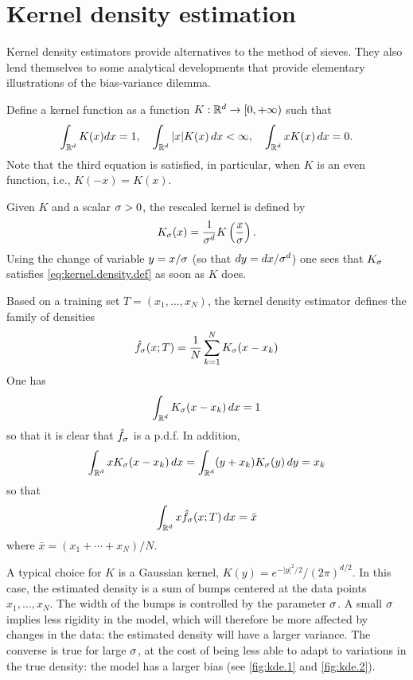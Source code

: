 \section{Kernel density  estimation}
Kernel density estimators \cite{parzen1962estimation,sheather1991reliable,silverman1998density} provide alternatives to the method of sieves. They also lend themselves to some analytical developments that provide elementary illustrations of the bias-variance dilemma.

Define a kernel function as a function $K: {\mathbb{R}}^d \to [0, +\infty)$ such that
\begin{equation}
\label{eq:kernel.density.def}
\int_{{\mathbb{R}}^d} K(x) dx = 1,\quad \int_{{\mathbb{R}}^d} |x| K(x)\, dx <\infty, \quad \int_{{\mathbb{R}}^d} x K(x)\, dx = 0.
\end{equation}
Note that the third equation is satisfied, in particular, when $K$ is an even function, i.e., $K(-x) = K(x)$. 

Given $K$ and a scalar  $\sigma >0$, the rescaled kernel is defined by
\[
K_\sigma(x) = \frac{1}{\sigma^d} K\left(\frac x {\sigma}\right).
\]
Using the change of variable $y = x/\sigma$ (so that $dy =
dx/\sigma^d$) one sees that $K_\sigma$ satisfies \cref{eq:kernel.density.def} as soon as $K$ does.

Based on a training set $T = (x_1, \ldots, x_N)$, the kernel density estimator defines the family of densities
$$
\hat f_\sigma(x; T)  = \frac{1}{N} \sum_{k=1}^N K_\sigma(x-x_k)
$$
One has 
\[
\int_{{\mathbb{R}}^d} K_\sigma(x-x_k)\, dx = 1
\]
so that it is clear that $\hat f_\sigma$ is a p.d.f. In addition, 
\[
\int_{{\mathbb{R}}^d} xK_\sigma(x-x_k)\, dx = \int_{{\mathbb{R}}^d} (y+x_k)K_\sigma(y)\, dy = x_k
\]
so that 
\[
\int_{{\mathbb{R}}^d} x {\hat{f}}_\sigma(x;T)\, dx = \bar x
\]
where $\bar x = (x_1 + \cdots + x_N)/N$.



A typical choice for $K$ is a Gaussian kernel, $K(y) =
e^{-|y|^2/2}/(2\pi)^{d/2}$. In this case, the estimated density is a sum
of bumps centered at the data points $x_1, \ldots, x_N$. The width of
the bumps is controlled by the parameter $\sigma$.  A small $\sigma$
implies less rigidity in the model, which will therefore be more
affected by changes in the data: the estimated density will have a
larger variance. The converse is true for large $\sigma$, at the cost of
being less able to adapt to variations in the true density: the model
has a larger bias (see \cref{fig:kde.1} and \cref{fig:kde.2}).


